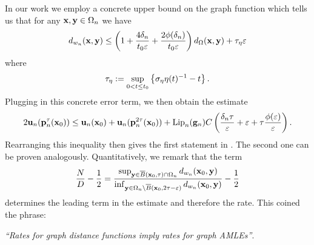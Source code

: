 %
%
In our work we employ a concrete upper bound on the graph function \cite[Lem. 5.5]{bungert2021uniform} which tells us that for any $\mathbf{x},\mathbf{y}\in \Omega_n$ we have
%
\begin{equation*}
d_{w_n}(\mathbf{x},\mathbf{y}) \leq \left(1 + \frac{4\delta_n}{t_0\varepsilon} + \frac{2\phi(\delta_n)}{t_0\varepsilon}\right) d_\Omega(\mathbf{x},\mathbf{y}) + \tau_\eta \varepsilon
\end{equation*}
where
\begin{equation*}
\tau_\eta := \sup_{0 < t \leq t_0}\left\{\sigma_\eta \eta(t)^{-1} - t\right\}.
\end{equation*}
%
Plugging in this concrete error term, we then obtain the estimate
%
\begin{align*}
2\mathbf{u}_n(\mathbf{p}_n^\tau(\mathbf{x}_0)) 
\leq
\mathbf{u}_n(\mathbf{x}_0)+\mathbf{u}_n(\mathbf{p}_n^{2\tau}(\mathbf{x}_0))+ 
\operatorname{Lip}_n(\mathbf{g}_n)C\left(\frac{\delta_n\tau}{\varepsilon}+\varepsilon
+\tau\frac{\phi(\varepsilon)}{\varepsilon}
\right).
\end{align*}
%
Rearranging this inequality then gives the first statement in \cite[Th. 5.13]{bungert2021uniform}. The second one can be proven analogously. Quantitatively, we remark that the term
%
\begin{align}\label{eq:leadingrate}
\frac{N}{D} - \frac{1}{2} = 
\frac{\sup_{\mathbf{y}\in\overline{B}(\mathbf{x}_0, \tau)\cap\Omega_n} d_{w_n}(\mathbf{x}_0, \mathbf{y})}{\inf_{\mathbf{y}\in \Omega_n\setminus \overline{B}(\mathbf{x}_0, 2\tau - \varepsilon)} d_{w_n}(\mathbf{x}_0, \mathbf{y})} - \frac{1}{2}
\end{align}
%
determines the leading term in the estimate and therefore the rate. This coined the phrase:
%
\begin{center}
\textit{\enquote{Rates for graph distance functions imply rates for graph AMLEs}}.
\end{center}
%
%
